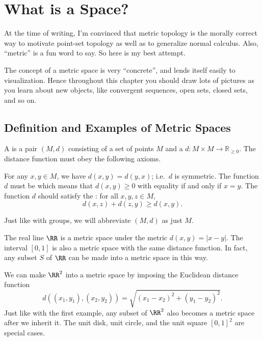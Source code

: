 \chapter{What is a Space?}
At the time of writing, I'm convinced that metric topology is the morally correct way to motivate point-set topology as well as to generalize normal calculus.
Also, ``metric'' is a fun word to say.
So here is my best attempt.

The concept of a metric space is very ``concrete'', and lends itself easily to visualization. Hence throughout this chapter you should draw lots of pictures as you learn about new objects, like convergent sequences, open sets, closed sets, and so on.

\section{Definition and Examples of Metric Spaces}
\begin{definition}
	A  is a pair $(M, d)$ consisting of
	a set of points $M$
	and a  $d : M \times M \to \mathbb R_{\ge 0}$.
	The distance function must obey the following axioms.
	\begin{itemize}
		\ii For any $x,y \in M$, we have $d(x,y) = d(y,x)$; i.e.\ $d$ is symmetric.
		\ii The function $d$ must be 
		which means that $d(x,y) \ge 0$ with equality if and only if $x=y$.
		\ii The function $d$ should satisfy the : for all $x,y,z \in M$,
		\[ d(x,z) + d(z,y) \ge d(x,y). \]
	\end{itemize}
\end{definition}
\begin{abuse}
	Just like with groups, we will abbreviate $(M,d)$ as just $M$.
\end{abuse}
\begin{example}
	\listhack
	\begin{enumerate}[(a)]
		\ii The real line $\RR$ is a metric space under the metric $d(x,y) = \left\lvert x-y \right\rvert$.
		\ii The interval $[0,1]$ is also a metric space with the same distance function.
		\ii In fact, any subset $S$ of $\RR$ can be made into a metric space in this way.
	\end{enumerate}
\end{example}
\begin{example}
	\listhack
	\begin{enumerate}[(a)]
		\ii We can make $\RR^2$ into a metric space by imposing the Euclidean distance function
		\[ d\left( (x_1, y_1), (x_2, y_2) \right) = \sqrt{(x_1-x_2)^2 + (y_1-y_2)^2}. \]
		\ii Just like with the first example, any subset of $\RR^2$ also becomes a metric space after we inherit it.
		The unit disk, unit circle, and the unit square $[0,1]^2$
		are special cases.
	\end{enumerate}
\end{example}
